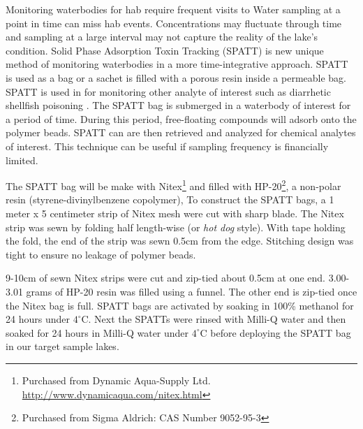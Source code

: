 

 \label{ch:spattss}




Monitoring waterbodies for \gls{hab} require frequent visits to
Water sampling at a point in time can miss \gls{hab} events. Concentrations may fluctuate through time and sampling at a large interval may not capture the reality of the lake's condition. Solid Phase Adsorption Toxin Tracking (SPATT) is new unique method of monitoring waterbodies in a more time-integrative approach. SPATT is used as a bag or a sachet is filled with a porous resin inside a permeable bag.
SPATT is used in for monitoring other analyte of interest such as diarrhetic shellfish poisoning \cite{mackenzie_solid_2004}. %
The SPATT bag  is submerged in a waterbody of interest for a period of time. During this period, free-floating compounds will adsorb onto the polymer beads.  SPATT can are then retrieved and analyzed for chemical analytes of interest. This technique can be useful if sampling frequency is financially limited.






The SPATT bag will be make with Nitex\footnote{Purchased from Dynamic Aqua-Supply Ltd.  \url{http://www.dynamicaqua.com/nitex.html}} and filled with HP-20\footnote{Purchased from Sigma Aldrich: CAS Number 9052-95-3}, a non-polar resin (styrene-divinylbenzene copolymer),
To construct the SPATT bags, a 1 meter x 5 centimeter strip of Nitex mesh were cut with sharp blade. The Nitex strip was sewn by folding half length-wise (or \emph{hot dog} style). With tape holding the fold, the end of the strip was sewn 0.5cm from the edge. Stitching design was tight to ensure no leakage of polymer beads.

9-10cm of sewn Nitex strips were cut and zip-tied about 0.5cm at one end. 3.00-3.01 grams of HP-20 resin was filled using a funnel. The other end is zip-tied once the Nitex bag is full. SPATT bags are activated by soaking in 100\% methanol for 24 hours under $4^\circ$C. Next the SPATTs were rinsed with Milli-Q water and then soaked for 24 hours in Milli-Q water under $4^\circ$C before deploying the SPATT bag in our target sample lakes.

